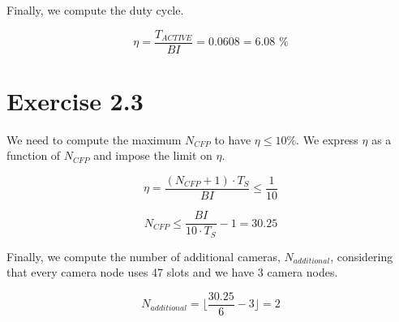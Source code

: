 Finally, we compute the duty cycle.

\begin{equation}
\eta = \frac{T_{ACTIVE}}{BI} = 0.0608 = 6.08\text{ \%}
\end{equation}

\section{Exercise 2.3}
We need to compute the maximum $N_{CFP}$ to have $\eta \leq 10 \%$. We express $\eta$ as a function of $N_{CFP}$ and impose the limit on $\eta$.

\begin{equation}
\eta = \frac{(N_{CFP} + 1) \cdot T_S}{BI} \leq \frac{1}{10}
\end{equation}

\begin{equation}
N_{CFP} \leq \frac{BI}{10 \cdot T_S} - 1 = 30.25
\end{equation}

Finally, we compute the number of additional cameras, $N_{additional}$, considering that every camera node uses 47 slots and we have 3 camera nodes.

\begin{equation}
N_{additional} = \lfloor \frac{30.25}{6} - 3 \rfloor = 2 
\end{equation}







